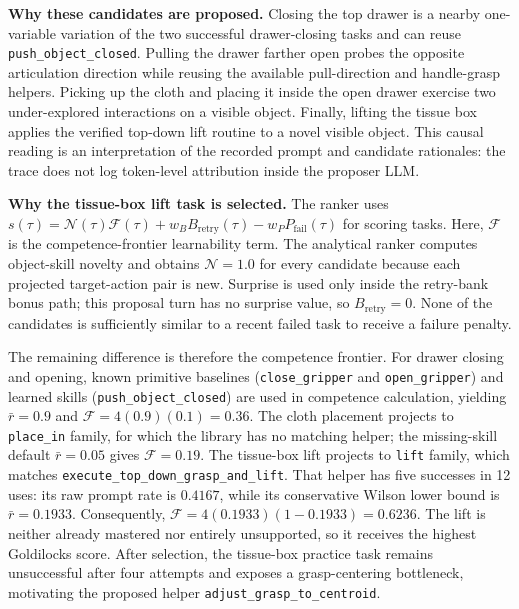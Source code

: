 \documentclass{llmxive}
\begin{document}
\textbf{Why these candidates are proposed.}
Closing the top drawer is a nearby one-variable variation
of the two successful drawer-closing tasks and can reuse
\texttt{push\_object\_closed}. Pulling the drawer farther open probes the
opposite articulation direction while reusing the available pull-direction and
handle-grasp helpers. Picking up the cloth and placing it inside the open drawer
exercise two under-explored interactions on a visible object. Finally, lifting the
tissue box applies the verified top-down lift routine to a novel visible
object. This causal reading is an interpretation of the recorded prompt and
candidate rationales: the trace does not log token-level attribution inside the
proposer LLM.

\textbf{Why the tissue-box lift task is selected.}
The ranker uses
$s(\tau)=\mathcal{N}(\tau)\mathcal{F}(\tau)+w_BB_{\mathrm{retry}}(\tau)
-w_PP_{\mathrm{fail}}(\tau)$ for scoring tasks. Here, $\mathcal{F}$ is the competence-frontier learnability term. The analytical ranker computes
object-skill novelty and obtains $\mathcal{N}=1.0$ for every
candidate because each projected target-action pair is new. Surprise is used
only inside the retry-bank bonus path; this proposal turn has no surprise value, so $B_{\mathrm{retry}}=0$. None of the candidates
is sufficiently similar to a recent failed task to receive a failure penalty.

The remaining difference is therefore the competence frontier. For drawer closing and
opening, known primitive baselines
(\texttt{close\_gripper} and \texttt{open\_gripper}) and learned skills (\texttt{push\_object\_closed}) are used in competence calculation, yielding
$\bar{r}=0.9$ and $\mathcal{F}=4(0.9)(0.1)=0.36$. The cloth placement projects to \texttt{place\_in} family, for which the
library has no matching helper; the missing-skill default $\bar{r}=0.05$ gives
$\mathcal{F}=0.19$. The tissue-box lift projects to \texttt{lift} family, which
matches \texttt{execute\_top\_down\_grasp\_and\_lift}. That helper has five
successes in 12 uses: its raw prompt rate is $0.4167$, while its conservative
Wilson lower bound is $\bar{r}=0.1933$. Consequently,
$\mathcal{F}=4(0.1933)(1-0.1933)=0.6236$. The lift is neither already mastered
nor entirely unsupported, so it receives the highest Goldilocks score. After
selection, the tissue-box practice task remains unsuccessful after four
attempts and exposes a grasp-centering bottleneck, motivating the proposed
helper \texttt{adjust\_grasp\_to\_centroid}.
\end{document}
